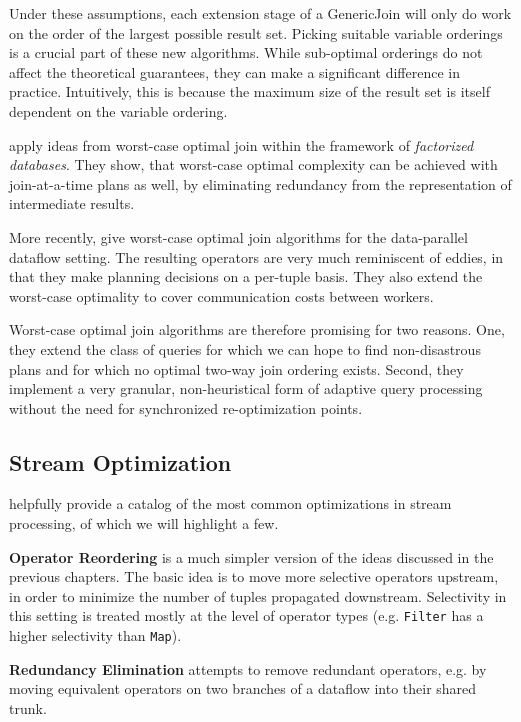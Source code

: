 \documentclass[../index.tex]{subfiles}
\begin{document}
Under these assumptions, each extension stage of a GenericJoin will
only do work on the order of the largest possible result set. Picking
suitable variable orderings is a crucial part of these new
algorithms. While sub-optimal orderings do not affect the theoretical
guarantees, they can make a significant difference in
practice. Intuitively, this is because the maximum size of the result
set is itself dependent on the variable ordering.

\cite{ciucanu2015worst} apply ideas from worst-case optimal join
within the framework of \emph{factorized databases}. They show, that
worst-case optimal complexity can be achieved with join-at-a-time
plans as well, by eliminating redundancy from the representation of
intermediate results.

More recently, \cite{ammar2018distributed} give worst-case optimal
join algorithms for the data-parallel dataflow setting. The resulting
operators are very much reminiscent of eddies, in that they make
planning decisions on a per-tuple basis. They also extend the
worst-case optimality to cover communication costs between workers.

Worst-case optimal join algorithms are therefore promising for two
reasons. One, they extend the class of queries for which we can hope
to find non-disastrous plans and for which no optimal two-way join
ordering exists. Second, they implement a very granular,
non-heuristical form of adaptive query processing without the need for
synchronized re-optimization points.

\subsection{Stream Optimization}

\cite{hirzel2014catalog} helpfully provide a catalog of the most
common optimizations in stream processing, of which we will highlight
a few.

\textbf{Operator Reordering} is a much simpler version of the ideas
discussed in the previous chapters. The basic idea is to move more
selective operators upstream, in order to minimize the number of
tuples propagated downstream. Selectivity in this setting is treated
mostly at the level of operator types (e.g. \texttt{Filter} has a
higher selectivity than \texttt{Map}).

\textbf{Redundancy Elimination} attempts to remove redundant operators,
e.g. by moving equivalent operators on two branches of a dataflow into
their shared trunk.
\end{document}
